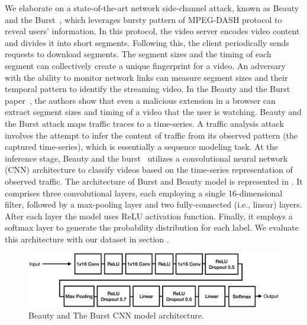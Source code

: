 We elaborate on a state-of-the-art network side-channel attack, known as Beauty and the Burst~\cite{schuster2017beautyburst}, which leverages bursty pattern of MPEG-DASH protocol to reveal users' information. 
In this protocol, the video server encodes video content and divides it into short segments.
Following this, the client periodically sends requests to download segments.
The segment sizes and the timing of each segment can collectively create a unique fingerprint for a video.
An adversary with the ability to monitor network links can measure segment sizes and their temporal pattern to identify the streaming video.
In the Beauty and the Burst paper~\cite{schuster2017beautyburst}, the authors show that even a malicious extension in a browser can extract segment sizes and timing of a video that the user is watching.
Beauty and the Burst attack maps traffic traces to a time-series.
A traffic analysis attack involves the attempt to infer the content of traffic from its observed pattern (\ie the captured time-series), which is essentially a sequence modeling task.
At the inference stage, Beauty and the burst~\cite{schuster2017beautyburst} utilizes a convolutional neural network (CNN) architecture to classify videos based on the time-series representation of observed traffic.
The architecture of Burst and Beauty model is represented in . 
It comprises three convolutional layers, each employing a single 16-dimensional filter, followed by a max-pooling layer and two fully-connected (i.e., linear) layers.
After each layer the model uses ReLU activation function.
Finally,  it employs a softmax layer to generate the probability distribution for each label.
We evaluate this architecture with our dataset in section .
\begin{figure}[t]
  \centering
  \includegraphics[width=\columnwidth]{figures/BandB_arch.pdf}
  \caption{Beauty and The Burst CNN model architecture.}
  \label{fig:bandb-arch}
\end{figure}

